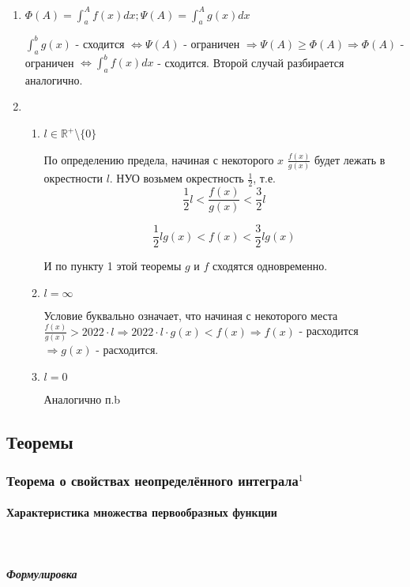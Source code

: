 \documentclass{article}
\let\vanillaparagraph\paragraph
\let\vanillasubparagraph\subparagraph
\renewcommand{\paragraph}[1]{\vanillaparagraph{#1}\mbox{}\\}
\renewcommand{\subparagraph}[1]{\vanillasubparagraph{#1}\mbox{}\\}
\begin{document}
\begin{enumerate}
    \item 
        $\Phi(A) = \int_a^A f(x)dx; \Psi(A) = \int_a^Ag(x)dx$

        $\int_a^bg(x)$ - сходится $\Leftrightarrow \Psi(A)$ - ограничен $\Rightarrow \Psi(A) \geq \Phi(A) \Rightarrow \Phi(A)$ - ограничен $\Leftrightarrow \int_a^b f(x)dx$ - сходится.
        Второй случай разбирается аналогично.
    \item
        \begin{enumerate}
            \item $ l \in \mathbb{R}^+$\textbackslash$\{0\}$

                По определению предела, начиная с некоторого $x$ $\frac{f(x)}{g(x)}$ будет лежать в окрестности $l$. НУО возьмем окрестность $\frac{1}{2}$, т.е.
                $$
                \frac{1}{2}l < \frac{f(x)}{g(x)} < \frac{3}{2}l
                $$

                $$
                \frac{1}{2}l g(x) < f(x) < \frac{3}{2} l g(x)
                $$

                И по пункту 1 этой теоремы $g$ и $f$ сходятся одновременно.
            \item $l = \infty$

                Условие буквально означает, что начиная с некоторого места $\frac{f(x)}{g(x)} > 2022\cdot l \Rightarrow 2022\cdot l\cdot g(x) < f(x) \Rightarrow f(x)$ - расходится $\Rightarrow g(x)$ - расходится.
            \item $l = 0$

                Аналогично п.b
        \end{enumerate}

\end{enumerate}

\newpage

\subsection{Теоремы}
\subsubsection{Теорема о свойствах неопределённого интеграла\texorpdfstring{$^1$}{}}
\paragraph{Характеристика множества первообразных функции}
\subparagraph{Формулировка}
\end{document}

